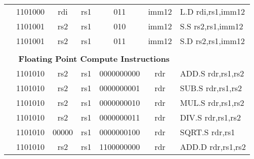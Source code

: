 \begin{table}[p]
\begin{small}
\begin{center}
\begin{tabular}{rcccccccccl}
&
\multicolumn{2}{|c|}{1101000} &
\multicolumn{1}{c|}{rdi} &
\multicolumn{1}{c|}{rs1} &
\multicolumn{1}{c|}{011} &
\multicolumn{4}{c|}{imm12} & L.D rdi,rs1,imm12 \\
\cline{2-10}
  

&
\multicolumn{2}{|c|}{1101001} &
\multicolumn{1}{c|}{rs2} &
\multicolumn{1}{c|}{rs1} &
\multicolumn{1}{c|}{010} &
\multicolumn{4}{c|}{imm12} & S.S rs2,rs1,imm12 \\
\cline{2-10}
  

&
\multicolumn{2}{|c|}{1101001} &
\multicolumn{1}{c|}{rs2} &
\multicolumn{1}{c|}{rs1} &
\multicolumn{1}{c|}{011} &
\multicolumn{4}{c|}{imm12} & S.D rs2,rs1,imm12 \\
\cline{2-10}
  

&
\multicolumn{9}{c}{} & \\
&
\multicolumn{9}{c}{\bf Floating Point Compute Instructions} & \\
\cline{2-10}
  

&
\multicolumn{2}{|c|}{1101010} &
\multicolumn{1}{c|}{rs2} &
\multicolumn{1}{c|}{rs1} &
\multicolumn{4}{c|}{0000000000} &
\multicolumn{1}{c|}{rdr} & ADD.S rdr,rs1,rs2 \\
\cline{2-10}
  

&
\multicolumn{2}{|c|}{1101010} &
\multicolumn{1}{c|}{rs2} &
\multicolumn{1}{c|}{rs1} &
\multicolumn{4}{c|}{0000000001} &
\multicolumn{1}{c|}{rdr} & SUB.S rdr,rs1,rs2 \\
\cline{2-10}
  

&
\multicolumn{2}{|c|}{1101010} &
\multicolumn{1}{c|}{rs2} &
\multicolumn{1}{c|}{rs1} &
\multicolumn{4}{c|}{0000000010} &
\multicolumn{1}{c|}{rdr} & MUL.S rdr,rs1,rs2 \\
\cline{2-10}
  

&
\multicolumn{2}{|c|}{1101010} &
\multicolumn{1}{c|}{rs2} &
\multicolumn{1}{c|}{rs1} &
\multicolumn{4}{c|}{0000000011} &
\multicolumn{1}{c|}{rdr} & DIV.S rdr,rs1,rs2 \\
\cline{2-10}
  

&
\multicolumn{2}{|c|}{1101010} &
\multicolumn{1}{c|}{00000} &
\multicolumn{1}{c|}{rs1} &
\multicolumn{4}{c|}{0000000100} &
\multicolumn{1}{c|}{rdr} & SQRT.S rdr,rs1 \\
\cline{2-10}
  

&
\multicolumn{2}{|c|}{1101010} &
\multicolumn{1}{c|}{rs2} &
\multicolumn{1}{c|}{rs1} &
\multicolumn{4}{c|}{1100000000} &
\multicolumn{1}{c|}{rdr} & ADD.D rdr,rs1,rs2 \\
\cline{2-10}
  


\end{tabular}
\end{center}
\end{small}
\end{table}
